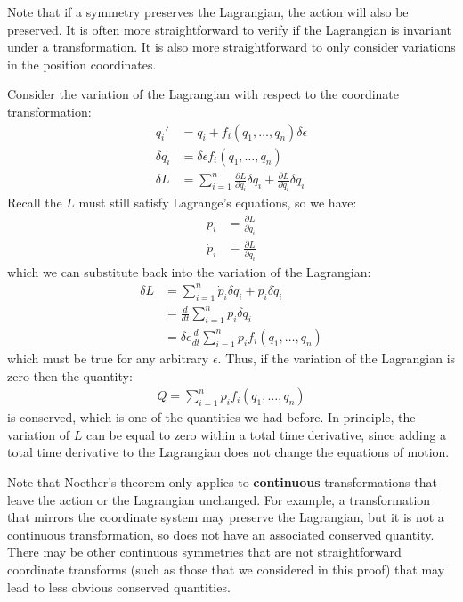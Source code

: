 Note that if a symmetry preserves the Lagrangian, the action will also be preserved. It is often more straightforward to verify if the Lagrangian is invariant under a transformation. It is also more straightforward to only consider variations in the position coordinates.

Consider the variation of the Lagrangian with respect to the coordinate transformation:
\begin{align}
q_i'&=q_i+f_i(q_1,\dots ,q_n)\delta\epsilon\nonumber\\
\delta q_i&=\delta\epsilon f_i(q_1,\dots ,q_n)\nonumber\\
\delta L&=\sum_{i=1}^n \frac{\partial L}{\partial q_i}\delta q_i+\frac{\partial L}{\partial \dot{q}_i}\delta \dot{q}_i
\end{align}
Recall the $L$ must still satisfy Lagrange's equations, so we have:
\begin{align}
p_i&=\frac{\partial L}{\partial \dot{q}_i}\nonumber\\
\dot{p}_i&=\frac{\partial L}{\partial q_i}
\end{align}
which we can substitute back into the variation of the Lagrangian:
\begin{align}
\delta L&=\sum_{i=1}^n \dot{p}_i\delta q_i+p_i\delta \dot{q}_i\nonumber\\
&=\frac{d}{dt}\sum_{i=1}^np_i\delta q_i\nonumber\\
&=\delta\epsilon \frac{d}{dt}\sum_{i=1}^np_if_i(q_1,\dots ,q_n)
\end{align}
which must be true for any arbitrary $\epsilon$. Thus, if the variation of the Lagrangian is zero then the quantity:
\begin{align}
Q=\sum_{i=1}^np_if_i(q_1,\dots ,q_n)
\end{align}
is conserved, which is one of the quantities we had before. In principle, the variation of $L$ can be equal to zero within a total time derivative, since adding a total time derivative to the Lagrangian does not change the equations of motion.

Note that Noether's theorem only applies to \textbf{continuous} transformations that leave the action or the Lagrangian unchanged. For example, a transformation that mirrors the coordinate system may preserve the Lagrangian, but it is not a continuous transformation, so does not have an associated conserved quantity. There may be other continuous symmetries that are not straightforward coordinate transforms (such as those that we considered in this proof) that may lead to less obvious conserved quantities. 

